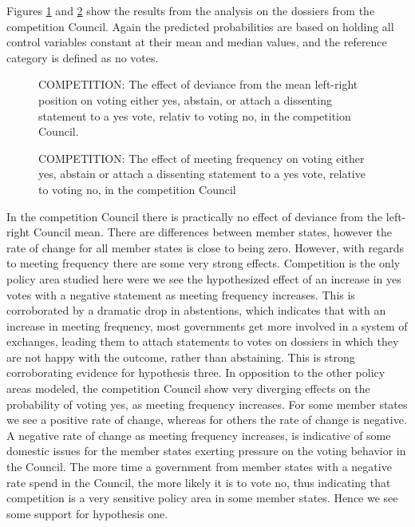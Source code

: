Figures \ref{fig:devComp} and \ref{fig:meetComp} show the results from the analysis on the dossiers from the competition Council. Again the predicted probabilities are based on holding all control variables constant at their mean and median values, and the reference category is defined as no votes. 

\begin{figure}[htp]
  \centering
  \scalebox{.7}{
    
  }
\caption{COMPETITION: The effect of deviance from the mean left-right position on voting either yes, abstain, or attach a dissenting statement to a yes vote, relativ to voting no, in the competition Council.}
\label{fig:devComp}
\end{figure}

\begin{figure}[htp]
  \centering
  \scalebox{.7}{
    
  }
\caption{COMPETITION: The effect of meeting frequency on voting either yes, abstain or attach a dissenting statement to a yes vote, relative to voting no,  in the competition Council}
\label{fig:meetComp}
\end{figure}

In the competition Council there is practically no effect of deviance from the left-right Council mean. There are differences between member states, however the rate of change for all member states is close to being zero. However, with regards to meeting frequency there are some very strong effects. Competition is the only policy area studied here were we see the hypothesized effect of an increase in yes votes with a negative statement as meeting frequency increases. This is corroborated by a dramatic drop in abstentions, which indicates that with an increase in meeting frequency, most governments get more involved in a system of exchanges, leading them to attach statements to votes on dossiers in which they are not happy with the outcome, rather than abstaining. This is strong corroborating evidence for hypothesis three. In opposition to the other policy areas modeled, the competition Council show very diverging effects on the probability of voting yes, as meeting frequency increases. For some member states we see a positive rate of change, whereas for others the rate of change is negative. A negative rate of change as meeting frequency increases, is indicative of some domestic issues for the member states exerting pressure on the voting behavior in the Council. The more time a government from member states with a negative rate spend in the Council, the more likely it is to vote no, thus indicating that competition is a very sensitive policy area in some member states. Hence we see some support for hypothesis one. 

